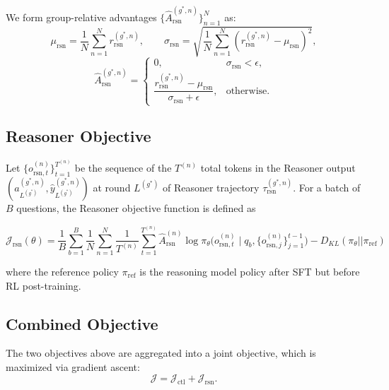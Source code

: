 We form group-relative advantages $\{\hat{A}_{\text{rsn}}^{(g^*,n)}\}_{n=1}^N$ as:
%
\begin{equation}
\mu_\text{rsn} = \frac{1}{N}\sum_{n=1}^{N} r_{\text{rsn}}^{(g^*,n)}, \qquad
\sigma_\text{rsn} = \sqrt{\frac{1}{N}\sum_{n=1}^{N}(r_{\text{rsn}}^{(g^*,n)} - \mu_\text{rsn})^2},
\end{equation}
\begin{equation}
\hat{A}_{\text{rsn}}^{(g^*,n)} =
\begin{cases}
0, & \sigma_\text{rsn} < \epsilon,\\[4pt]
\dfrac{r_{\text{rsn}}^{(g^*,n)} - \mu_\text{rsn}}{\sigma_\text{rsn} + \epsilon}, & \text{otherwise.}
\end{cases}
\end{equation}
%

\subsection{Reasoner Objective}
\label{app:reasoner_objective}

Let $\{o_{\text{rsn},t}^{(n)}\}_{t=1}^{T^{(n)}}$ be the sequence of the $T^{(n)}$ total tokens in the Reasoner output $(a^{(g^*,n)}_{L^{(g^*)}},\hat{y}^{(g^*,n)}_{L^{(g^*)}})$ at round $L^{(g^*)}$ of Reasoner trajectory $\tau_\text{rsn}^{(g^*,n)}$. For a batch of $B$ questions, the Reasoner objective function is defined as

\begin{equation}
\label{eq:controller_loss_app}
\mathcal{J}_{\text{rsn}}(\theta)
=
\frac{1}{B}\sum_{b=1}^{B}\frac{1}{N}\sum_{n=1}^{N} \frac{1}{T^{(n)}} \sum_{t=1}^{T^{(n)}} \hat{A}_{\text{rsn}}^{(n)} \log \pi_\theta\Big(o_{\text{rsn},t}^{(n)}\mid q_b, \{o_{\text{rsn},j}^{(n)}\}_{j=1}^{t-1}\Big) - D_{KL}(\pi_\theta||\pi_\text{ref})
\end{equation}

where the reference policy $\pi_\text{ref}$ is the reasoning model policy after SFT but before RL post-training.

\subsection{Combined Objective}

The two objectives above are aggregated into a joint objective, which is maximized via gradient ascent:
\begin{equation}
\mathcal{J} = \mathcal{J}_{\text{ctl}} + \mathcal{J}_{\text{rsn}}.
\end{equation}

